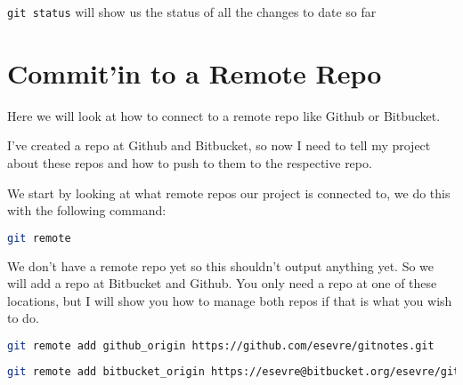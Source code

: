 \documentclass[a4paper]{spie} %
\begin{document}
\texttt{git status} will show us the status of all the changes to date so far



\section*{Commit'in to a Remote Repo}
Here we will look at how to connect to a remote repo like Github or Bitbucket. 

I've created a repo at Github and Bitbucket, so now I need to tell my project about these repos and how to push to them to the respective repo.

We start by looking at what remote repos our project is connected to, we do this with the following command:
\begin{lstlisting}[language=bash]
git remote
\end{lstlisting}

We don't have a remote repo yet so this shouldn't output anything yet. So we will add a repo at Bitbucket and Github. You only need a repo at one of these locations, but I will show you how to manage both repos if that is what you wish to do.


\begin{lstlisting}[language=bash]
git remote add github_origin https://github.com/esevre/gitnotes.git
\end{lstlisting}
\begin{lstlisting}[language=bash]
git remote add bitbucket_origin https://esevre@bitbucket.org/esevre/gitnotes.git
\end{lstlisting}
\end{document}
